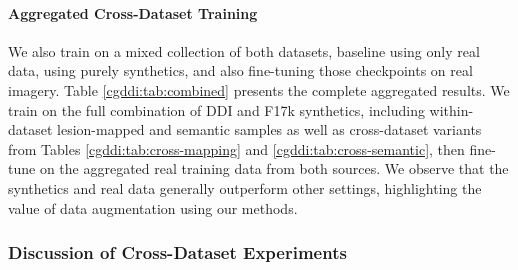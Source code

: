 \documentclass[11pt]{ucthesis}
\begin{document}
\paragraph{Aggregated Cross-Dataset Training}
We also train on a mixed collection of both datasets, baseline using only real data, using purely synthetics, and also fine-tuning those checkpoints on real imagery. Table \ref{cgddi:tab:combined} presents the complete aggregated results. We train on the full combination of DDI and F17k synthetics, including within-dataset lesion-mapped and semantic samples as well as cross-dataset variants from Tables \ref{cgddi:tab:cross-mapping} and \ref{cgddi:tab:cross-semantic}, then fine-tune on the aggregated real training data from both sources. We observe that the synthetics and real data generally outperform other settings, highlighting the value of data augmentation using our methods.

\begin{table}[h]
\centering
\caption{Aggregated cross-dataset performance. The baseline model is trained on mixed real data.}
\label{cgddi:tab:combined}
\end{table}


\subsubsection{Discussion of Cross-Dataset Experiments}
\end{document}
